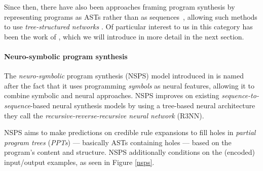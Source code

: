 \documentclass{article}
\begin{document}
Since then, there have also been approaches framing program synthesis by representing programs as ASTs rather than as sequences~\citep{polosukhin2018neural},
allowing such methods to use \emph{tree-structured networks}%
.
Of particular interest to us in this category has been the work of \citet{nsps},
which we will introduce in more detail in the next section.

\paragraph{Neuro-symbolic program synthesis} \label{sec:nsps}

The \emph{neuro-symbolic} program synthesis (NSPS) model introduced in \citet{nsps} is named after the fact that it uses programming \emph{symbols} as neural features,
allowing it to combine symbolic and neural approaches.
NSPS improves on existing \emph{sequence-to-sequence}-based neural synthesis models by using a tree-based neural architecture they call the \emph{recursive-reverse-recursive neural network} (R3NN).

NSPS aims to make predictions on credible rule expansions to fill holes
in \emph{partial program trees} (\emph{PPTs}) --- basically ASTs containing holes --- based on the program's content and structure.
NSPS additionally conditions on the (encoded) input/output examples, as seen in Figure \ref{nsps}.
\end{document}
